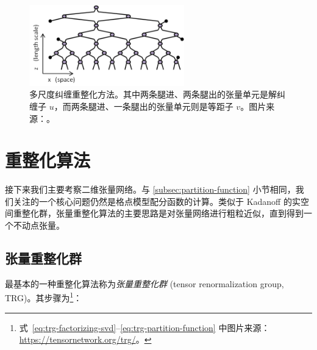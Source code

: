 \begin{figure}[htb]
  \centering
  \includegraphics[width=0.6\textwidth]{images/tensor-network/mera.pdf}
  \caption[多尺度纠缠重整化方法]{多尺度纠缠重整化方法。其中两条腿进、两条腿出的张量单元是解纠缠子 $u$，而两条腿进、一条腿出的张量单元则是等距子 $v$。图片来源：\parencite{evenbly2011tensor}。}
  \label{fig:mera}
\end{figure}

\section{重整化算法}

接下来我们主要考察二维张量网络。与 \ref{subsec:partition-function} 小节相同，我们关注的一个核心问题仍然是格点模型配分函数的计算。类似于 Kadanoff 的实空间重整化群\cite{pathria2011statistical}，张量重整化算法的主要思路是对张量网络进行粗粒近似，直到得到一个不动点张量。

\subsection{张量重整化群}

最基本的一种重整化算法称为\emph{张量重整化群} (tensor renormalization group, TRG)\cite{levin2007tensor}。其步骤为\footnote{式~\eqref{eq:trg-factorizing-svd}--\eqref{eq:trg-partition-function} 中图片来源：\url{https://tensornetwork.org/trg/}。}：

